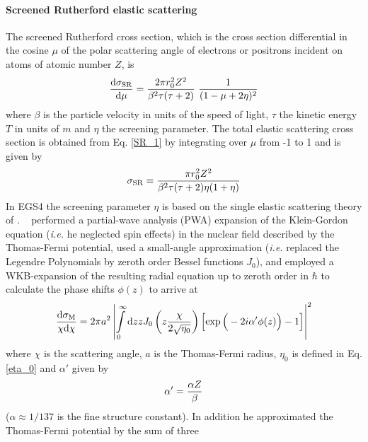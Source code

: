 \paragraph{Screened Rutherford elastic scattering} \hfill
{}

The screened Rutherford cross section, which is the cross 
section differential in the cosine $\mu$ of the polar
scattering angle of electrons or positrons incident 
on atoms of atomic number $Z$, is 
\begin{equation}
\label{SR_1}
{{\rm d} \sigma_{\rm SR} \over {\rm d}\mu} = {2 \pi r_0^2 Z^2 \over 
\beta^2 \tau (\tau + 2) }~{1 \over (1 - \mu + 2 \eta)^2} 
\end{equation}
where $\beta$ is the particle velocity in units of the speed of 
light, $\tau$ the kinetic energy $T$ in units of $m$ 
and $\eta$ the screening parameter. The total elastic scattering 
cross section is obtained from Eq. \eqref{SR_1} by integrating 
over $\mu$ from -1 to 1 and is given by
\begin{equation}
\label{SR_2}
\sigma_{\rm SR} = {\pi r_0^2 Z^2 \over \beta^2 \tau (\tau+2) \eta (1 + \eta)}
\end{equation}
In EGS4 the screening parameter $\eta$ is based on the single 
elastic scattering theory of \Mol \cite{Mo47}. \Mol~ 
performed a partial-wave analysis (PWA) expansion 
of the Klein-Gordon equation ({\em i.e.} he neglected spin effects) 
in the nuclear field described by the Thomas-Fermi potential, 
used a small-angle approximation ({\em i.e.} replaced the Legendre 
Polynomials by zeroth order Bessel functions $J_0$), 
and employed a WKB-expansion 
of the resulting radial equation up to zeroth order in $\hbar$ 
to calculate the phase shifts $\phi(z)$ to arrive at
\begin{equation}
\label{el_mol}
{{\rm d} \sigma_{\rm M} \over \chi {\rm d} \chi} = 
2 \pi a^2 \left| \int\limits_0^\infty {\rm d}z z J_0\left(z {\chi \over 
2 \sqrt{\eta_0}} \right) \left[ \exp\Big( - 2 i \alpha' 
\phi(z) \Big) - 1 \right] 
\right|^2
\end{equation}
where $\chi$ is the scattering angle, $a$ is the Thomas-Fermi radius,  
$\eta_0$ is defined in Eq. \eqref{eta_0} and $\alpha'$ given by
\begin{equation}
\label{alpha_prime}
\alpha' = {\alpha Z \over \beta}
\end{equation}
($\alpha \approx 1/137$ is the fine structure constant). In addition
he approximated the Thomas-Fermi potential by the sum of three 
